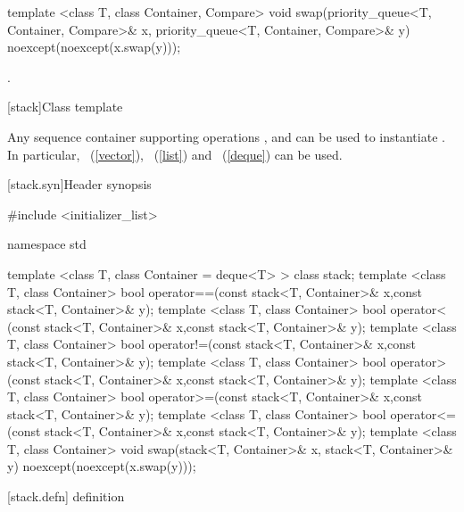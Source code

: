 %
%
\begin{itemdecl}
template <class T, class Container, Compare>
  void swap(priority_queue<T, Container, Compare>& x,
            priority_queue<T, Container, Compare>& y) noexcept(noexcept(x.swap(y)));
\end{itemdecl}

\begin{itemdescr}
\pnum
\effects {}.
\end{itemdescr}

[stack]{Class template }

\pnum
{}%
Any sequence container supporting operations
,
and
can be used to instantiate
.
In particular,
~(\ref{vector}),
~(\ref{list})
and
~(\ref{deque})
can be used.

[stack.syn]{Header  synopsis}%

\begin{codeblock}
#include <initializer_list>

namespace std {

  template <class T, class Container = deque<T> > class stack;
  template <class T, class Container>
    bool operator==(const stack<T, Container>& x,const stack<T, Container>& y);
  template <class T, class Container>
    bool operator< (const stack<T, Container>& x,const stack<T, Container>& y);
  template <class T, class Container>
    bool operator!=(const stack<T, Container>& x,const stack<T, Container>& y);
  template <class T, class Container>
    bool operator> (const stack<T, Container>& x,const stack<T, Container>& y);
  template <class T, class Container>
    bool operator>=(const stack<T, Container>& x,const stack<T, Container>& y);
  template <class T, class Container>
    bool operator<=(const stack<T, Container>& x,const stack<T, Container>& y);
  template <class T, class Container>
    void swap(stack<T, Container>& x, stack<T, Container>& y) noexcept(noexcept(x.swap(y)));
}
\end{codeblock}

[stack.defn]{ definition}

